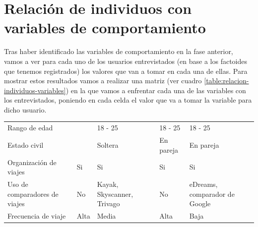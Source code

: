 \section{Relación de individuos con variables de comportamiento}
Tras haber identificado las variables de comportamiento en la fase anterior, vamos a ver para cada uno de los usuarios entrevistados (en base a los factoides
que tenemos registrados) los valores que van a tomar en cada una de ellas. Para mostrar estos resultados vamos a realizar una matriz (ver cuadro \ref{table:relacion-individuos-variables})
en la que vamos a enfrentar cada una de las variables con los entrevistados, poniendo en cada celda el valor que va a tomar la variable para dicho usuario.
\begin{table}[H]
    \centering
    \begin{tabular}{|p{10em}|p{7em}|p{7em}|p{7em}|p{8em}|}
        \hline
        \cellcolor{black}                 & \cellcolor{black}{\textcolor{white}{Madi}}  & \cellcolor{black}{\textcolor{white}{Sofía}}   & \cellcolor{black}{\textcolor{white}{Alberto}} & \cellcolor{black}{\textcolor{white}{Beatriz}} \\ \hline
        Rango de edad                     &                                             & 18 - 25                                       & 18 - 25                                       & 18 - 25                                       \\ \hline
        Estado civil                      &                                             & Soltera                                       & En pareja                                     & En pareja                                     \\ \hline
        Organización de viajes            & Si                                          & Si                                            & Si                                            & Si                                            \\ \hline
        Uso de comparadores de viajes     & No                                          & Kayak, Skyscanner, Trivago                    & No                                            & eDreams, comparador de Google                 \\ \hline
        Frecuencia de viaje               & Alta                                        & Media                                         & Alta                                          & Baja                                          \\ \hline

\end{tabular}
\end{table}
